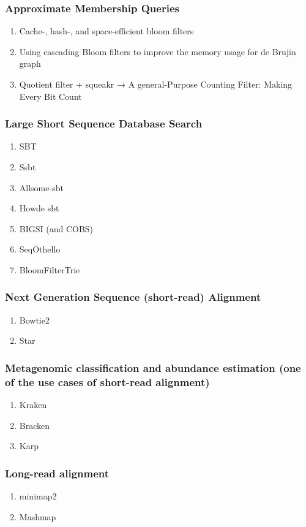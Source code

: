 \subsubsection{Approximate Membership Queries}
\begin{enumerate}
    \item Cache-, hash-, and space-efficient bloom filters
    \item Using cascading Bloom filters to improve the memory usage for de Brujin graph
    \item Quotient filter + squeakr → A general-Purpose Counting Filter: Making Every Bit Count
\end{enumerate}
\subsubsection{Large Short Sequence Database Search}
\begin{enumerate}
    \item SBT
    \item Ssbt
    \item Allsome-sbt
    \item Howde sbt
    \item BIGSI (and COBS)
    \item SeqOthello
    \item BloomFilterTrie
\end{enumerate}
\subsubsection{Next Generation Sequence (short-read) Alignment}
\begin{enumerate}
    \item Bowtie2
    \item Star
\end{enumerate}
\subsubsection{Metagenomic classification and abundance estimation (one of the use cases of short-read alignment)}
\begin{enumerate}
    \item Kraken
    \item Bracken
    \item Karp
\end{enumerate}
\subsubsection{Long-read alignment}
\begin{enumerate}
    \item minimap2
    \item Mashmap
\end{enumerate}
